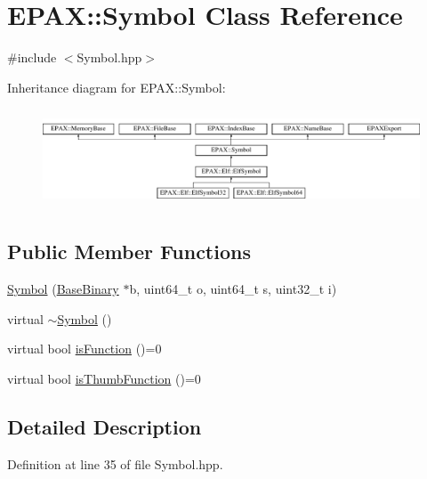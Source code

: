 \hypertarget{class_e_p_a_x_1_1_symbol}{\section{\-E\-P\-A\-X\-:\-:\-Symbol \-Class \-Reference}
\label{class_e_p_a_x_1_1_symbol}
}


{\ttfamily \#include $<$\-Symbol.\-hpp$>$}

\-Inheritance diagram for \-E\-P\-A\-X\-:\-:\-Symbol\-:\begin{figure}[H]
\begin{center}
\leavevmode
\includegraphics[height=2.966887cm]{class_e_p_a_x_1_1_symbol}
\end{center}
\end{figure}
\subsection*{\-Public \-Member \-Functions}
\begin{DoxyCompactItemize}
\item 
\hyperlink{class_e_p_a_x_1_1_symbol_a4d1c4e92f875293df6903aeb01b7be3f}{\-Symbol} (\hyperlink{class_e_p_a_x_1_1_base_binary}{\-Base\-Binary} $\ast$b, uint64\-\_\-t o, uint64\-\_\-t s, uint32\-\_\-t i)
\item 
virtual \hyperlink{class_e_p_a_x_1_1_symbol_ae0bd01bf034fe2209cfcea1054d04ded}{$\sim$\-Symbol} ()
\item 
virtual bool \hyperlink{class_e_p_a_x_1_1_symbol_a1dc3c27cb8debeda55cad9d3e04a7be5}{is\-Function} ()=0
\item 
virtual bool \hyperlink{class_e_p_a_x_1_1_symbol_a58d8007f908063fc4602c042a739bd8f}{is\-Thumb\-Function} ()=0
\end{DoxyCompactItemize}


\subsection{\-Detailed \-Description}


\-Definition at line 35 of file \-Symbol.\-hpp.



